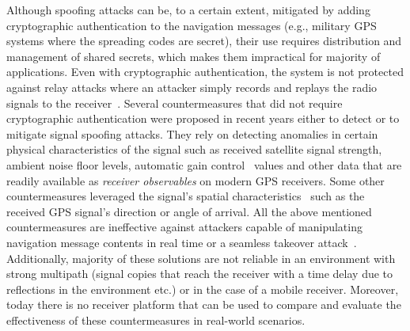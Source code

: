 \documentclass[letterpaper,twocolumn,10pt]{article}
\makeatletter
\newcommand{\etc}{etc.\@\xspace}
\makeatother
\begin{document}
Although spoofing attacks can be, to a certain extent, mitigated by adding cryptographic authentication to the navigation messages (e.g., military GPS systems where the spreading codes are secret), their use requires distribution and management of shared secrets, which makes them impractical for majority of applications. Even with cryptographic authentication, the system is not protected against relay attacks where an attacker simply records and replays the radio signals to the receiver~\cite{Papadimitratos2008}. Several countermeasures that did not require cryptographic authentication were proposed in recent years either to detect or to mitigate signal spoofing attacks. They rely on detecting anomalies in certain physical characteristics of the signal such as received satellite signal strength, ambient noise floor levels, automatic gain control~\cite{Akos2012} values and other data that are readily available as \textit{receiver observables} on modern GPS receivers. Some other countermeasures leveraged the signal's spatial characteristics~\cite{Montgomery2009,psiaki2013gnss} such as the received GPS signal's direction or angle of arrival. All the above mentioned countermeasures are ineffective against attackers capable of manipulating navigation message contents in real time or a seamless takeover attack~\cite{NighswanderCCS2012,Tippenhauer2011}. Additionally, majority of these solutions are not reliable in an environment with strong multipath (signal copies that reach the receiver with a time delay due to reflections in the environment \etc) or in the case of a mobile receiver. Moreover, today there is no receiver platform that can be used to compare and evaluate the effectiveness of these countermeasures in real-world scenarios.   
\end{document}

